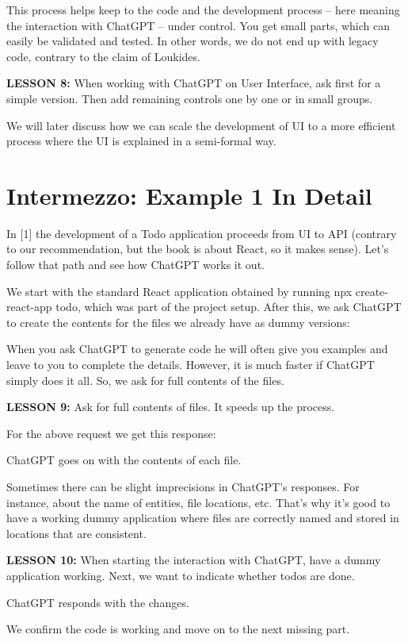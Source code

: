 \documentclass[runningheads]{llncs}
\begin{document}
This process helps keep to the code and the development process – here meaning the interaction with ChatGPT – under control. You get small parts, which can easily be validated and tested. In other words, we do not end up with legacy code, contrary to the claim of Loukides\cite{Loukides2023}.

\textbf{LESSON 8:} When working with ChatGPT on User Interface, ask first for a simple version. Then add remaining controls one by one or in small groups.

We will later discuss how we can scale the development of UI to a more efficient process where the UI is explained in a semi-formal way.

\section{Intermezzo: Example 1 In Detail}
In [1] the development of a Todo application proceeds from UI to API (contrary to our recommendation, but the book is about React, so it makes sense). Let's follow that path and see how ChatGPT works it out.

We start with the standard React application obtained by running npx create-react-app todo, which was part of the project setup. After this, we ask ChatGPT to create the contents for the files we already have as dummy versions:

When you ask ChatGPT to generate code he will often give you examples and leave to you to complete the details. However, it is much faster if ChatGPT simply does it all. So, we ask for full contents of the files.

\textbf{LESSON 9:} Ask for full contents of files. It speeds up the process.

For the above request we get this response:

ChatGPT goes on with the contents of each file.
   
Sometimes there can be slight imprecisions in ChatGPT's responses. For instance, about the name of entities, file locations, etc. That's why it's good to have a working dummy application where files are correctly named and stored in locations that are consistent.

\textbf{LESSON 10:} When starting the interaction with ChatGPT, have a dummy application working.
Next, we want to indicate whether todos are done.

ChatGPT responds with the changes.
    
We confirm the code is working and move on to the next missing part.
\end{document}
